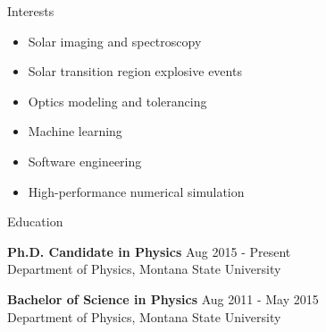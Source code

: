 \documentclass{resume} %
\begin{document}

%
%
%

\begin{rSection}{Interests}
	\begin{minipage}{0.5\textwidth}
		\begin{itemize}[leftmargin=*]
			\item Solar imaging and spectroscopy
			\item Solar transition region explosive events
			\item Optics modeling and tolerancing
		\end{itemize}
	\end{minipage}
	\begin{minipage}{0.5\textwidth}
		\begin{itemize}[leftmargin=*]
			\item Machine learning
			\item Software engineering
			\item High-performance numerical simulation
		\end{itemize}
	\end{minipage}
\end{rSection} 

\begin{rSection}{Education}

{\bf Ph.D. Candidate in Physics} \hfill { Aug 2015 - Present}
\\
Department of Physics, Montana State University

{\bf Bachelor of Science in Physics} \hfill { Aug 2011 - May 2015 }
\\
Department of Physics, Montana State University

\end{rSection}
\end{document}
